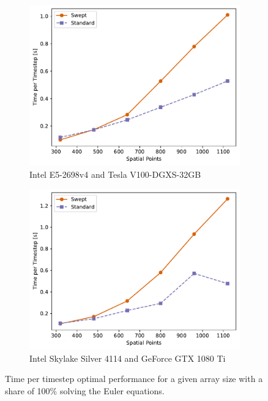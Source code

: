\documentclass[mca,article,submit,moreauthors,pdftex]{Definitions/mdpi}
\def\oldCPU{Intel Skylake Silver 4114} %
\def\oldGPU{GeForce GTX 1080 Ti}
\def\newCPU{Intel E5-2698v4} %
\def\newGPU{Tesla V100-DGXS-32GB}
\begin{document}
\begin{figure}[htbp]
    \widefigure
    \begin{subfigure}[b]{0.45\textwidth}
        \widefigure
        \includegraphics[scale=0.55]{figs/maxNeweuler.pdf}
        \caption{\newCPU{} and \newGPU{}}
        \label{fig:MaxCasesEulerNew}
    \end{subfigure}
    \begin{subfigure}[b]{0.5\textwidth}
        \widefigure
        \includegraphics[scale=0.55]{figs/maxOldeuler.pdf}
        \caption{\oldCPU{} and \oldGPU{}}
        \label{fig:MaxCasesEulerOld}
    \end{subfigure}
    \caption{Time per timestep optimal performance for a given array size with a share of 100\% solving the Euler equations.}
    \label{fig:max-euler}
\end{figure}
\end{document}
